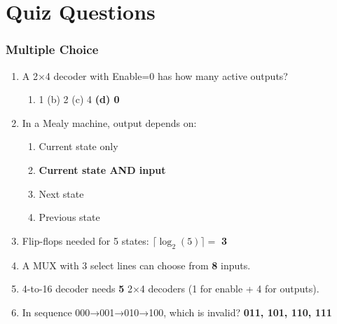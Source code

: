 \documentclass[12pt,a4paper]{article}
\begin{document}
\newpage
\part{Quiz Questions}

\section{Multiple Choice}

\begin{enumerate}[label=\textbf{Q\arabic*.}]

\item A 2×4 decoder with Enable=0 has how many active outputs?
\begin{enumerate}[label=(\alph*)]
  \item 1 \quad (b) 2 \quad (c) 4 \quad \textbf{(d) 0} \checkmark
\end{enumerate}
\vspace{0.2cm}

\item In a Mealy machine, output depends on:
\begin{enumerate}[label=(\alph*)]
  \item Current state only
  \item \textbf{Current state AND input} \checkmark
  \item Next state
  \item Previous state
\end{enumerate}
\vspace{0.2cm}

\item Flip-flops needed for 5 states: $\lceil \log_2(5) \rceil = $ \textbf{3}
\vspace{0.2cm}

\item A MUX with 3 select lines can choose from \textbf{8} inputs.
\vspace{0.2cm}

\item 4-to-16 decoder needs \textbf{5} 2×4 decoders (1 for enable + 4 for outputs).
\vspace{0.2cm}

\item In sequence 000→001→010→100, which is invalid? \textbf{011, 101, 110, 111}

\end{enumerate}
\end{document}
